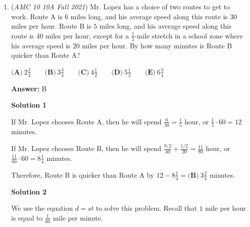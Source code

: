 \begin{enumerate}
 By an overestimation $\pi\approx\frac{22}{7},$ we have $4\pi<\frac{88}{7},$ or $\frac{81}{4\pi}>6\frac{39}{88}.$

 Together, we get 
 \[6 < 6\frac{39}{88} < \frac{81}{4\pi} < 6\frac34 < 7,\]from which $\left\lfloor\frac{81}{4\pi}\right\rfloor=\boxed{\textbf{(D) }6}.$




\textbf{Solution 3 (Approximation)}

As shown in Solution 1, we conclude that the maximum number of balls that can completely fit inside a cube is $\left\lfloor\frac{81}{4\pi}\right\rfloor.$

 Approximating with $\pi\approx3,$ we have $\frac{81}{4\pi}\approx6\frac34.$ Since $\pi$ is about $5\%$ greater than $3,$ it is safe to claim that $\left\lfloor\frac{81}{4\pi}\right\rfloor=\boxed{\textbf{(D) }6}.$



	\item (\textit{AMC 10 10A Fall 2021}) Mr. Lopez has a choice of two routes to get to work. Route A is $6$ miles long, and his average speed along this route is $30$ miles per hour. Route B is $5$ miles long, and his average speed along this route is $40$ miles per hour, except for a $\frac{1}{2}$-mile stretch in a school zone where his average speed is $20$ miles per hour. By how many minutes is Route B quicker than Route A?


 $\textbf{(A)}\ 2 \frac{3}{4}  \qquad\textbf{(B)}\  3 \frac{3}{4} \qquad\textbf{(C)}\  4 \frac{1}{2} \qquad\textbf{(D)}\  5 \frac{1}{2} \qquad\textbf{(E)}\ 6 \frac{3}{4}$

 \textbf{Answer: }B



\textbf{Solution 1}

If Mr. Lopez chooses Route A, then he will spend $\frac{6}{30}=\frac{1}{5}$ hour, or $\frac{1}{5}\cdot60=12$ minutes.

 If Mr. Lopez chooses Route B, then he will spend $\frac{9/2}{40}+\frac{1/2}{20}=\frac{11}{80}$ hour, or $\frac{11}{80}\cdot60=8\frac14$ minutes.

 Therefore, Route B is quicker than Route A by $12-8\frac14=\boxed{\textbf{(B)}\  3 \frac{3}{4}}$ minutes.

 



\textbf{Solution 2}

We use the equation $d=st$ to solve this problem. Recall that $1$ mile per hour is equal to $\frac{1}{60}$ mile per minute.


\end{enumerate}

